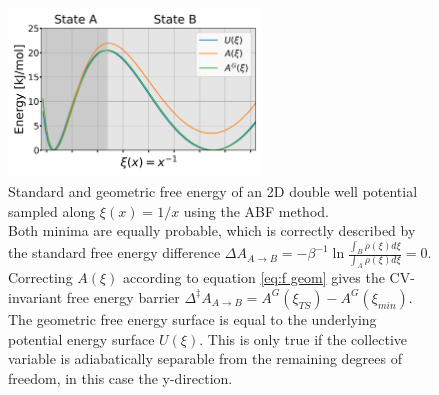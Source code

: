 \begin{figure}[H]
    \centering
    \includegraphics[width=0.6\textwidth]{bilder/geom_free_energy}
    \caption{
      Standard and geometric free energy of an 2D double well potential sampled along $\xi(x)=1/x$ using the ABF method.\\
      Both minima are equally probable, which is correctly described by the standard free energy difference $\Delta A_{A\rightarrow B}=-\beta^{-1}\ln \frac{\int_B \rho(\xi)d\xi}{\int_A \rho(\xi)d\xi}=0$.\\
      Correcting $A(\xi)$ according to equation \ref{eq:f geom} gives the CV-invariant free energy barrier $\Delta^\ddagger  A_{A\rightarrow B}=A^G(\xi_{TS})-A^G(\xi_{min})$. The geometric free energy surface is equal to the underlying potential energy surface $U(\xi)$. This is only true if the collective variable is adiabatically separable from the remaining degrees of freedom, in this case the y-direction.\autocite{hartmann2011two}
    }
\label{fig:F geom}%
\end{figure}
